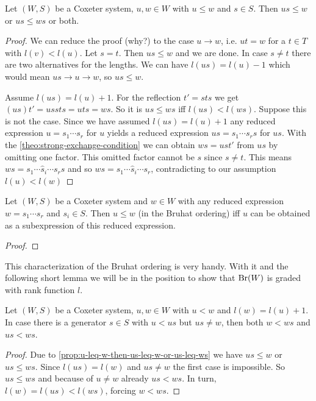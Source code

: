 \begin{prop}
	Let $(W,S)$ be a Coxeter system, $u,w \in W$ with $u \leq w$ and $s \in S$. Then $us \leq w$ or $us \leq ws$ or both.

	\begin{proof}
		We can reduce the proof (\todo why?) to the case $u \to w$, i.e. $ut = w$ for a $t \in T$ with $l(v) < l(u)$. Let $s = t$. Then $us \leq w$ and we are done. In case $s \neq t$ there are two alternatives for the lengths. We can have $l(us) = l(u) - 1$ which would mean $us \to u \to w$, so $us \leq w$.

		Assume $l(us) = l(u) + 1$. For the reflection $t' = sts$ we get $(us)t' = ussts = uts = ws$. So it is $us \leq ws$ iff $l(us) < l(ws)$. Suppose this is not the case. Since we have assumed $l(us) = l(u) + 1$ any reduced expression $u = s_1 \cdots s_r$ for $u$ yields a reduced expression $us = s_1 \cdots s_r s$ for $us$. With the \ref{theo:strong-exchange-condition} we can obtain $ws = ust'$ from $us$ by omitting one factor. This omitted factor cannot be $s$ since $s \neq t$. This means $ws = s_1 \cdots \hat s_i \cdots s_r s$ and so $ws = s_1 \cdots \hat s_i \cdots s_r$, contradicting to our assumption $l(u) < l(w)$
	\end{proof}
\end{prop}

\begin{theo}
	Let $(W,S)$ be a Coxeter system and $w \in W$ with any reduced expression $w = s_1 \cdots s_r$ and $s_i \in S$. Then $u \leq w$ (in the Bruhat ordering) iff $u$ can be obtained as a subexpression of this reduced expression.

	\begin{proof}
		\todo
	\end{proof}
\end{theo}

This characterization of the Bruhat ordering is very handy. With it and the following short lemma we will be in the position to show that $\operatorname{Br}(W)$ is graded with rank function $l$.

\begin{lemm}
	Let $(W,S)$ be a Coxeter system, $u,w \in W$ with $u < w$ and $l(w) = l(u) + 1$. In case there is a generator $s \in S$ with $u < us$ but $us \neq w$, then both $w < ws$ and $us < ws$.

	\begin{proof}
		Due to \ref{prop:u-leq-w-then-us-leq-w-or-us-leq-ws} we have $us \leq w$ or $us \leq ws$. Since $l(us) = l(w)$ and $us \neq w$ the first case is impossible. So $us \leq ws$ and because of $u \neq w$ already $us < ws$. In turn, $l(w) = l(us) < l(ws)$, forcing $w < ws$.
	\end{proof}
\end{lemm}

